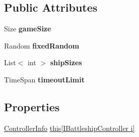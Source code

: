\subsection*{Public Attributes}
\begin{DoxyCompactItemize}
\item 
\hypertarget{class_m_b_c_1_1_core_1_1_m_b_c_field_a3047e7796b95481fdbb06a18b97e62e9}{Size {\bfseries game\-Size}}\label{class_m_b_c_1_1_core_1_1_m_b_c_field_a3047e7796b95481fdbb06a18b97e62e9}

\item 
\hypertarget{class_m_b_c_1_1_core_1_1_m_b_c_field_ae2ffc280745c7ff2085292ef7162ccb4}{Random {\bfseries fixed\-Random}}\label{class_m_b_c_1_1_core_1_1_m_b_c_field_ae2ffc280745c7ff2085292ef7162ccb4}

\item 
\hypertarget{class_m_b_c_1_1_core_1_1_m_b_c_field_ab0a4e2e8fd27793125caa95973782f16}{List$<$ int $>$ {\bfseries ship\-Sizes}}\label{class_m_b_c_1_1_core_1_1_m_b_c_field_ab0a4e2e8fd27793125caa95973782f16}

\item 
\hypertarget{class_m_b_c_1_1_core_1_1_m_b_c_field_ab4e965955b1ddb0184722225cac2ebac}{Time\-Span {\bfseries timeout\-Limit}}\label{class_m_b_c_1_1_core_1_1_m_b_c_field_ab4e965955b1ddb0184722225cac2ebac}

\end{DoxyCompactItemize}
\subsection*{Properties}
\begin{DoxyCompactItemize}
\item 
\hyperlink{class_m_b_c_1_1_core_1_1_m_b_c_field_1_1_controller_info}{Controller\-Info} \hyperlink{class_m_b_c_1_1_core_1_1_m_b_c_field_a828a3135253c94b9674ad00d095e128d}{this\mbox{[}\-I\-Battleship\-Controller i\mbox{]}}
\end{DoxyCompactItemize}


